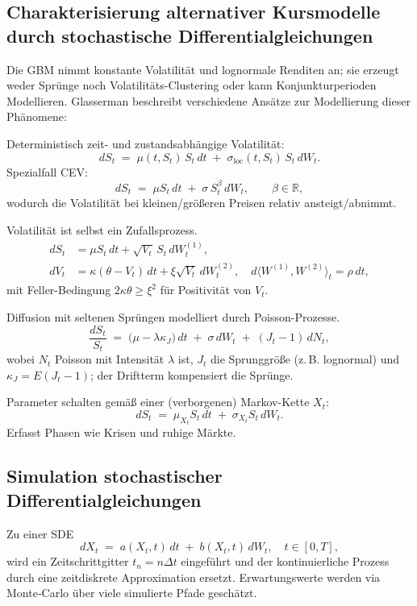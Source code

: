 \subsection{Charakterisierung alternativer Kursmodelle durch stochastische Differentialgleichungen}

Die GBM nimmt konstante Volatilität und lognormale Renditen an; sie erzeugt weder 
Sprünge noch Volatilitäts-Clustering oder kann Konjunkturperioden Modellieren.
Glasserman \cite{glasserman2003monte} beschreibt verschiedene Ansätze zur Modellierung dieser Phänomene:

\begin{bsp}
Deterministisch zeit- und zustandsabhängige Volatilität:
$$
dS_t \;=\; \mu(t,S_t)\,S_t\,dt \;+\; \sigma_{\mathrm{loc}}(t,S_t)\,S_t\,dW_t.
$$
Spezialfall CEV:
$$
dS_t \;=\; \mu S_t\,dt \;+\; \sigma\,S_t^{\beta}\,dW_t,\qquad \beta\in\mathbb R,
$$
wodurch die Volatilität bei kleinen/größeren Preisen relativ ansteigt/abnimmt.
\end{bsp}

\begin{bsp}
Volatilität ist selbst ein Zufallsprozess.
$$
\begin{aligned}
dS_t &= \mu S_t\,dt + \sqrt{V_t}\,S_t\,dW_t^{(1)},\\
dV_t &= \kappa(\theta - V_t)\,dt + \xi\sqrt{V_t}\,dW_t^{(2)},\quad d \langle W^{(1)},W^{(2)}\rangle_t=\rho\,dt,
\end{aligned}
$$
mit Feller-Bedingung $2\kappa\theta\ge \xi^2$ für Positivität von $V_t$.
\end{bsp}

\begin{bsp}
Diffusion mit seltenen Sprüngen modelliert durch Poisson-Prozesse.
$$
\frac{dS_t}{S_t} \;=\; \big(\mu - \lambda \kappa_J\big)\,dt \;+\; \sigma\,dW_t \;+\; (J_t-1)\,dN_t,
$$
wobei $N_t$ Poisson mit Intensität $\lambda$ ist, $J_t$ die Sprunggröße (z.\,B. lognormal) 
und $\kappa_J= E(J_t-1)$; der Driftterm kompensiert die Sprünge.
\end{bsp}

\begin{bsp}
Parameter schalten gemäß einer (verborgenen) Markov-Kette $X_t$:
$$
dS_t \;=\; \mu_{X_t} S_t\,dt \;+\; \sigma_{X_t} S_t\,dW_t.
$$
Erfasst Phasen wie Krisen und ruhige Märkte.
\end{bsp}

\subsection{Simulation stochastischer Differentialgleichungen}
Zu einer SDE
$$
dX_t \;=\; a(X_t,t)\,dt \;+\; b(X_t,t)\,dW_t,\quad t\in[0,T],
$$
wird ein Zeitschrittgitter $t_n=n\Delta t$ eingeführt und der kontinuierliche Prozess durch eine zeitdiskrete Approximation ersetzt. Erwartungswerte werden via Monte‑Carlo über viele simulierte Pfade geschätzt.

